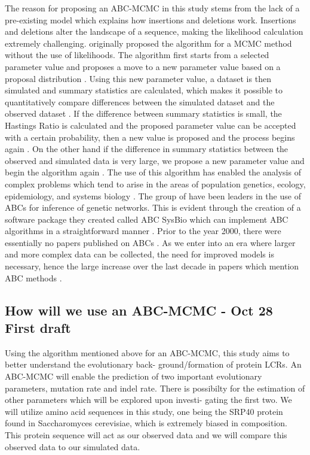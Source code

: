 \documentclass[10pt]{article}
\begin{document}
The reason for proposing an ABC-MCMC in this study stems from the lack of a pre-existing model which explains how
insertions and deletions work. Insertions and deletions alter the landscape of a sequence, making the likelihood calculation
extremely challenging. \citet{marjoram2003markov} originally proposed the algorithm for a MCMC method without the use of
likelihoods. The algorithm first starts from a selected parameter value and proposes a move to a new parameter value based
on a proposal distribution \citep{marjoram2003markov}. Using this new parameter value, a dataset is then simulated and summary
statistics are calculated, which makes it possible to quantitatively compare differences between the simulated dataset and the
observed dataset \citep{marjoram2003markov}. If the difference between summary statistics is small, the Hastings Ratio is calculated
and the proposed parameter value can be accepted with a certain probability, then a new value is proposed and the process begins
again \citep{marjoram2003markov}. On the other hand if the difference in summary statistics between the observed and simulated
data is very large, we propose a new parameter value and begin the algorithm again \citep{marjoram2003markov, marjoram2013approximation}. The use of this algorithm has enabled the analysis of complex problems which tend to arise in the areas of population genetics, ecology, epidemiology, and systems biology \citep{sunnaaker2013approximate}. The group of \citet{liepe2010abc} have been leaders in the use of ABCs for inference of genetic networks. This is evident through the creation of a software package they created called ABC SysBio which can implement ABC algorithms in a straightforward manner \citep{marjoram2013approximation, liepe2010abc}. Prior to the year 2000, there were essentially no papers published on ABCs \citep{marjoram2013approximation}. As we enter into an era where larger and more complex data can be collected, the need for improved models is necessary, hence the large increase over the last decade in papers which mention ABC methods \citep{marjoram2013approximation}.

\subsection{How will we use an ABC-MCMC - Oct 28 First draft}
Using the algorithm mentioned above for an ABC-MCMC, this study aims to better understand the evolutionary back-
ground/formation of protein LCRs. An ABC-MCMC will enable the prediction of two important evolutionary parameters,
mutation rate and indel rate. There is possibilty for the estimation of other parameters which will be explored upon investi-
gating the first two. We will utilize amino acid sequences in this study, one being the SRP40 protein found in Saccharomyces
cerevisiae, which is extremely biased in composition. This protein sequence will act as our observed data and we will compare
this observed data to our simulated data.
\end{document}
